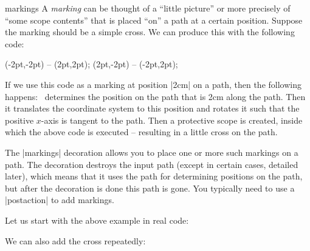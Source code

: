 \begin{decoration}{markings}
    A \emph{marking} can be thought of a ``little picture'' or more precisely
    of ``some scope contents'' that is placed ``on'' a path at a certain
    position. Suppose the marking should be a simple cross. We can produce this
    with the following code:
\begin{codeexample}
\draw (-2pt,-2pt) -- (2pt,2pt);
\draw (2pt,-2pt) -- (-2pt,2pt);
\end{codeexample}
    If we use this code as a marking at position |2cm| on a path, then the
    following happens: \pgfname\ determines the position on the path that is
    2cm along the path. Then it translates the coordinate system to this
    position and rotates it such that the positive $x$-axis is tangent to the
    path. Then a protective scope is created, inside which the above code is
    executed -- resulting in a little cross on the path.

    The |markings| decoration allows you to place one or more such markings on
    a path. The decoration destroys the input path (except in certain cases,
    detailed later), which means that it uses the path for determining
    positions on the path, but after the decoration is done this path is gone.
    You typically need to use a |postaction| to add markings.

    Let us start with the above example in real code:
\begin{codeexample}[preamble={\usetikzlibrary{decorations.markings}}]
\end{codeexample}

    We can also add the cross repeatedly:
\begin{codeexample}[preamble={\usetikzlibrary{decorations.markings}}]
\end{codeexample}


\end{decoration}
